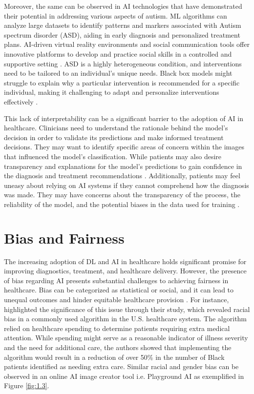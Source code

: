 \documentclass{article}
\begin{document}
Moreover, the same can be observed in AI technologies that have demonstrated their potential in addressing various aspects of autism. ML algorithms can analyze large datasets to identify patterns and markers associated with Autism spectrum disorder (ASD), aiding in early diagnosis and personalized treatment plans. AI-driven virtual reality environments and social communication tools offer innovative platforms to develop and practice social skills in a controlled and supportive setting \cite{jaliaawala2020can}. ASD is a highly heterogeneous condition, and interventions need to be tailored to an individual's unique needs. Black box models might struggle to explain why a particular intervention is recommended for a specific individual, making it challenging to adapt and personalize interventions effectively \cite{sharif2022novel}.

 This lack of interpretability can be a significant barrier to the adoption of AI in healthcare. Clinicians need to understand the rationale behind the model's decision in order to validate its predictions and make informed treatment decisions. They may want to identify specific areas of concern within the images that influenced the model's classification. While patients may also desire transparency and explanations for the model's predictions to gain confidence in the diagnosis and treatment recommendations \cite{srinivasu2022blackbox}. Additionally, patients may feel uneasy about relying on AI systems if they cannot comprehend how the diagnosis was made. They may have concerns about the transparency of the process, the reliability of the model, and the potential biases in the data used for training \cite{arcelus2007integration}. 
 
\section{Bias and Fairness}
The increasing adoption of DL and AI in healthcare holds significant promise for improving diagnostics, treatment, and healthcare delivery. However, the presence of bias regarding AI presents substantial challenges to achieving fairness in healthcare. Bias can be categorized as statistical or social, and it can lead to unequal outcomes and hinder equitable healthcare provision \cite{hendriksen2013diagnostic, nakayama2022global}. For instance, \cite{obermeyer2019dissecting} highlighted the significance of this issue through their study, which revealed racial bias in a commonly used algorithm in the U.S. healthcare system. The algorithm relied on healthcare spending to determine patients requiring extra medical attention. While spending might serve as a reasonable indicator of illness severity and the need for additional care, the authors showed that implementing the algorithm would result in a reduction of over 50\% in the number of Black patients identified as needing extra care. Similar racial and gender bias can be observed in an online AI image creator tool i.e. Playground AI \cite{mousavi2020ai} as exemplified in Figure \ref{fig:1.3}.
\end{document}
